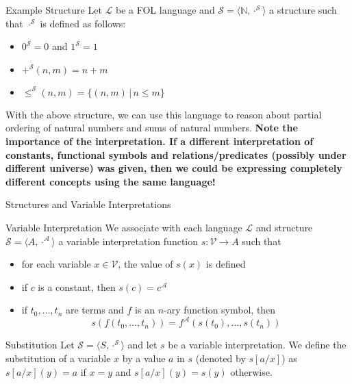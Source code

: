 \documentclass[aspectratio=169]{beamer}
\begin{document}
\begin{slide}{Example Structure}
Let $\mathcal{L}$ be a FOL language and $\mathcal{S} = \langle \mathbb{N},\cdot^\mathcal{S} \rangle$ a structure such that $\cdot^\mathcal{S}$ is defined as follows:
\begin{itemize}
  \item $0^\mathcal{S} = 0$ and $1^\mathcal{S} = 1$
  \item $+^\mathcal{S}(n,m) = n + m$
  \item $\leq^\mathcal{S}(n,m) = \{ (n,m) \,|\, n \leq m \}$
\end{itemize}
With the above structure, we can use this language to reason about partial ordering of natural numbers and sums of natural numbers. {\bf Note the importance of the interpretation. If a different interpretation of constants, functional symbols and relations/predicates (possibly under different universe) was given, then we could be expressing completely different concepts using the same language!}
\end{slide}


\begin{slide}{Structures and Variable Interpretations}
\begin{block}{Variable Interpretation}
We associate with each language $\mathcal{L}$ and structure $\mathcal{S} = \langle A, \cdot^\mathcal{A} \rangle$ a variable interpretation function $s : \mathcal{V} \to A$ such that
\begin{itemize}
  \item for each variable $x \in \mathcal{V}$, the value of $s(x)$ is defined
  \item if $c$ is a constant, then $s(c) = c^\mathcal{A}$
  \item if $t_0,\ldots,t_n$ are terms and $f$ is an $n$-ary function symbol, then 
  $$s(f(t_0,\ldots,t_n)) = f^\mathcal{A}(s(t_0),\ldots,s(t_n))$$
\end{itemize}
\end{block}
\begin{block}{Substitution}
Let $\mathcal{S} = \langle S, \cdot^\mathcal{S} \rangle$ and let $s$ be a variable interpretation. We define the substitution of a variable $x$ by a value $a$ in $s$ (denoted by $s[a/x]$) as $s[a/x](y) = a$ if $x = y$ and $s[a/x](y) = s(y)$ otherwise.
\end{block}


\end{slide}
\end{document}
